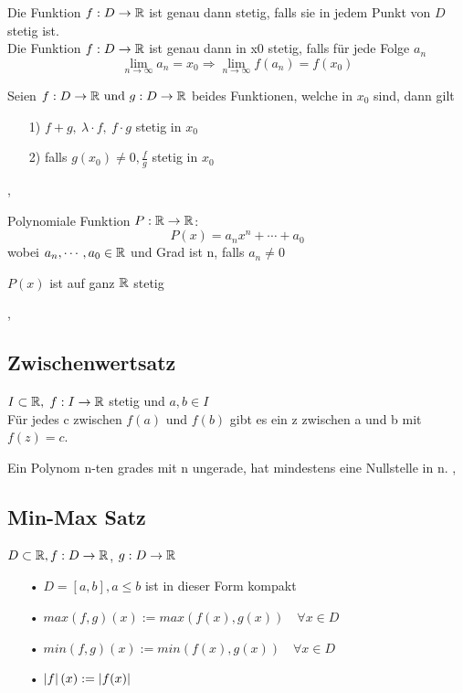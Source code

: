 \Def[3.2.2] Die Funktion $f: D \rightarrow \mathbb{R}$ ist genau dann stetig, falls sie in jedem Punkt von $D$ stetig ist.  \\

\Satz[3.2.4] Die Funktion $f : D \rightarrow \mathbb{R}$ ist genau dann in x0 stetig, falls für jede Folge $a_n$
\[ \lim \limits_{n \rightarrow \infty} a_{n}=x_{0} \Longrightarrow \lim \limits_{n \rightarrow \infty} f\left(a_{n}\right)=f\left(x_{0}\right) \] 

\Korollar[3.2.5] Seien ${f : D \rightarrow \mathbb{R}} \text{ und } {g : D \rightarrow \mathbb{R}}$ beides Funktionen, welche in $x_0$ sind, dann gilt
\begin{enumerate}
\item[1)] $f + g, \ \lambda \cdot f, \ f \cdot g$ stetig in $x_0$
\item[2)] falls $g(x_0) \neq 0, \frac{f}{g}$ stetig in $x_0$
\end{enumerate}

\sep

\Def[3.2.6] Polynomiale Funktion $P : \mathbb{R} \rightarrow \mathbb{R}$: 
\[P(x) = a_n x^n + \cdots + a_0 \]
wobei $a_n, \cdots, a_0 \in \mathbb{R}$ und Grad ist n, falls $a_n \neq 0$

\Korollar[2.3.7] $P(x)$ ist auf ganz $\mathbb{R}$ stetig

\sep

\subsection{Zwischenwertsatz} 

\Satz[3.3.1] $I \subset \mathbb{R}, $ $f: I \rightarrow \mathbb{R}$ stetig und $a, b \in I$ \\
Für jedes c zwischen $f(a)$ und $f(b)$ gibt es ein z zwischen a und b mit $f(z) = c$.

\Korollar[3.3.2] Ein Polynom n-ten grades mit n ungerade, hat mindestens eine Nullstelle in n.
\sep

\subsection{Min-Max Satz}

\Def[3.4.2] $D \subset \mathbb{R}, f : D \rightarrow \mathbb{R}$, $g  : D \rightarrow \mathbb{R}$
\begin{itemize}
\item[•] $D = [a, b], a \leq b$ ist in dieser Form kompakt
\item[•] $max(f, g) (x) := max (f(x), g(x)) \quad  \forall x \in D$
\item[•] $min(f, g) (x) := min (f(x), g(x)) \quad  \forall x \in D$
\item[•]$\left\lvert f \right\rvert(x) := \left\lvert f(x) \right\rvert$
\end{itemize} 

